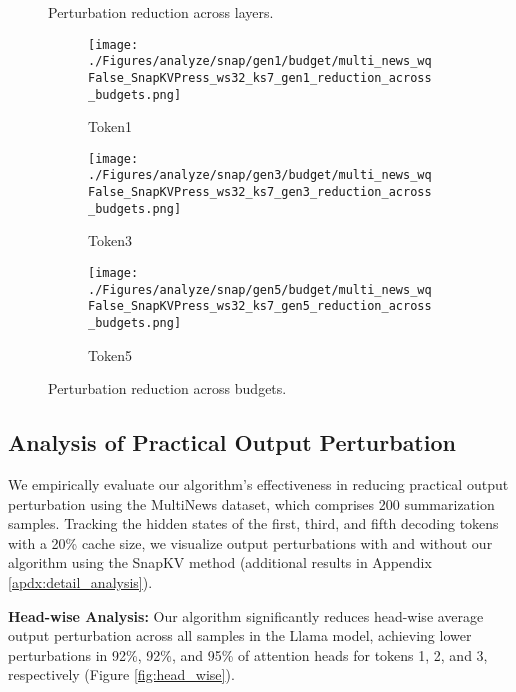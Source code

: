 \begin{figure}[t]
	\vspace{-0.4cm}
	\caption{Perturbation reduction across layers.} 
	\label{fig:layer_wise}
	\vspace{0.1cm}
	\begin{subfigure}[b]{0.325\linewidth}
		\texttt{[image: ./Figures/analyze/snap/gen1/budget/multi\_news\_wqFalse\_SnapKVPress\_ws32\_ks7\_gen1\_reduction\_across\_budgets.png]}
		\vspace{-0.5cm}
		\caption{Token1}
	\end{subfigure}
	\begin{subfigure}[b]{0.325\linewidth}		\texttt{[image: ./Figures/analyze/snap/gen3/budget/multi\_news\_wqFalse\_SnapKVPress\_ws32\_ks7\_gen3\_reduction\_across\_budgets.png]}
		\vspace{-0.5cm}
		\caption{Token3}
	\end{subfigure}
	\begin{subfigure}[b]{0.325\linewidth}
		\texttt{[image: ./Figures/analyze/snap/gen5/budget/multi\_news\_wqFalse\_SnapKVPress\_ws32\_ks7\_gen5\_reduction\_across\_budgets.png]}
		\vspace{-0.5cm}
		\caption{Token5}
	\end{subfigure}
	\vspace{-0.8cm}
	\caption{Perturbation reduction across budgets.} 
	\vspace{-0.7cm}
	\label{fig:budget-wise}
\end{figure}


\subsection{Analysis of Practical Output Perturbation}
\label{sc:ana}



We empirically evaluate our algorithm's effectiveness in reducing practical output perturbation using the MultiNews dataset, which comprises 200 summarization samples. Tracking the hidden states of the first, third, and fifth decoding tokens with a 20\% cache size, we visualize output perturbations with and without our algorithm using the SnapKV method (additional results in Appendix \ref{apdx:detail_analysis}).

\textbf{Head-wise Analysis:} Our algorithm significantly reduces head-wise average output perturbation across all samples in the Llama model, achieving lower perturbations in 92\%, 92\%, and 95\% of attention heads for tokens 1, 2, and 3, respectively (Figure \ref{fig:head_wise}). 

